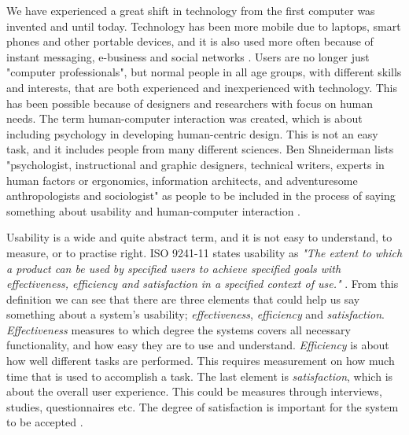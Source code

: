 We have experienced a great shift in technology from the first computer was invented and until today. Technology has been more mobile due to laptops, smart phones and other portable devices, and it is also used more often because of instant messaging, e-business and social networks \cite{mmi}. Users are no longer just "computer professionals", but normal people in all age groups, with different skills and interests, that are both experienced and inexperienced with technology. This has been possible because of designers and researchers with focus on human needs. The term human-computer interaction was created, which is about including psychology in developing human-centric design. This is not an easy task, and it includes people from  many different sciences. Ben Shneiderman lists "psychologist, instructional and graphic designers, technical writers, experts in human factors or ergonomics, information architects, and adventuresome anthropologists and sociologist" as people to be included in the process of saying something about usability and human-computer interaction \cite{mmi}.  

Usability is a wide and quite abstract term, and it is not easy to understand, to measure, or to practise right. ISO 9241-11 states usability as \emph{"The extent to which a product can be used by specified users to achieve specified goals with effectiveness, efficiency and satisfaction in a specified context of use."} \cite{usabilitydef}. From this definition we can see that there are three elements that could help us say something about a system's usability; \emph{effectiveness}, \emph{efficiency} and \emph{satisfaction}. \emph{Effectiveness} measures to which degree the systems covers all necessary functionality, and how easy they are to use and understand. \emph{Efficiency} is about how well different tasks are performed. This requires measurement on how much time that is used to accomplish a task. The last element is \emph{satisfaction}, which is about the overall user experience. This could be measures through interviews, studies, questionnaires etc. The degree of satisfaction is important for the system to be accepted \cite{mmi}. 

